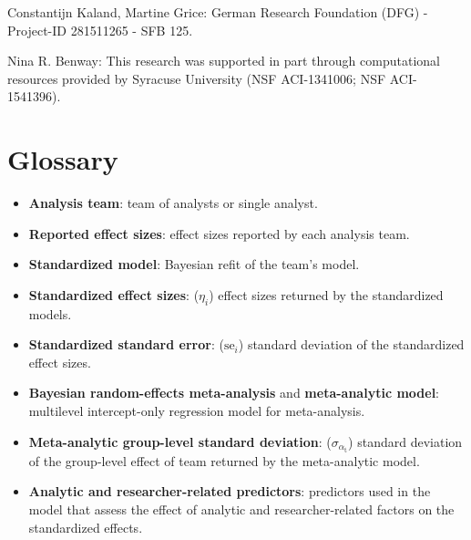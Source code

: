 \documentclass[Review,times,sageh]{sagej}
\providecommand{\tightlist}{\setlength{\itemsep}{0pt}\setlength{\parskip}{0pt}}
\begin{document}
Constantijn Kaland, Martine Grice: German Research Foundation (DFG) - Project-ID 281511265 - SFB 125.

Nina R. Benway: This research was supported in part through computational resources provided by Syracuse University (NSF ACI-1341006; NSF ACI-1541396).

\appendix

\hypertarget{glossary}{%
\section{Glossary}\label{glossary}}

\begin{itemize}
\tightlist
\item
  \textbf{Analysis team}: team of analysts or single analyst.
\item
  \textbf{Reported effect sizes}: effect sizes reported by each analysis team.
\item
  \textbf{Standardized model}: Bayesian refit of the team's model.
\item
  \textbf{Standardized effect sizes}: (\(\eta_i\)) effect sizes returned by the standardized models.
\item
  \textbf{Standardized standard error}: (\(\text{se}_i\)) standard deviation of the standardized effect sizes.
\item
  \textbf{Bayesian random-effects meta-analysis} and \textbf{meta-analytic model}: multilevel intercept-only regression model for meta-analysis.
\item
  \textbf{Meta-analytic group-level standard deviation}: (\(\sigma_{\alpha_{\text{t}}}\)) standard deviation of the group-level effect of team returned by the meta-analytic model.
\item
  \textbf{Analytic and researcher-related predictors}: predictors used in the model that assess the effect of analytic and researcher-related factors on the standardized effects.
\end{itemize}



\end{document}
